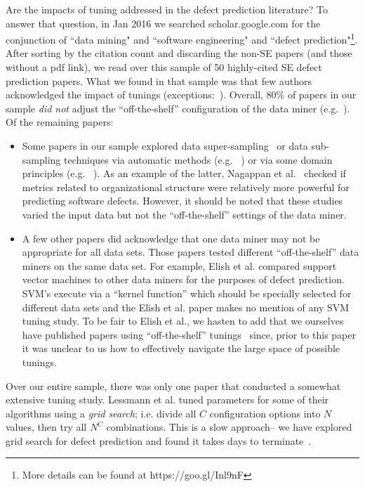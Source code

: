 \documentclass[smallextended]{svjour3}
\newcommand{\bi}{\begin{itemize}[leftmargin=0.4cm]}
\newcommand{\ei}{\end{itemize}}
\begin{document}
Are the impacts of tuning addressed in the defect prediction literature?
To answer that question,  in Jan 2016 we searched scholar.google.com for the conjunction of ``data mining" and ``software engineering" and  ``defect prediction"\footnote{More details can be found at https://goo.gl/Inl9nF}.
After sorting by the citation count and discarding the non-SE papers (and those without a pdf link), we read over this sample
of  50 highly-cited SE defect prediction papers. 
What we found in that sample was that few authors
acknowledged the impact of tunings (exceptions:~\cite{Gao:2011,lessmann2008benchmarking}).
Overall,  80\% of papers in our sample {\em did not} adjust
the ``off-the-shelf'' configuration of the data miner (e.g.~\cite{me07b,Moser:2008,Elish2008649}). Of the remaining papers:
\bi
\item
Some papers in our sample  explored   data super-sampling~\cite{4271036} or data sub-sampling techniques via  automatic methods (e.g. ~\cite{Gao:2011,me07b,4271036,Kim:2011}) 
or via some domain principles (e.g. ~\cite{Moser:2008,Nagappan:2008,Hassan:2009}).
As an example of the latter, Nagappan et al.~\cite{Nagappan:2008} checked if metrics related to organizational structure were relatively more powerful for predicting software defects. 
However, it should be noted that  these studies varied the input data but
not the   ``off-the-shelf''   settings of the data miner.
\item
A few other papers did acknowledge that one data miner may not be appropriate
for all data sets.  Those papers tested  different  
``off-the-shelf'' data miners on the same data set.
For example, Elish et al.\cite{Elish2008649}  compared support vector
machines to other data miners for the purposes of defect prediction. SVM's execute via a ``kernel function'' which should be specially selected for different data sets and
the Elish et al. paper  makes no mention of any SVM tuning study.  
To be fair to Elish et al., we hasten to add that we
ourselves have  published
papers using ``off-the-shelf'' tunings~\cite{me07b} since,
prior to this paper it was unclear to us how to effectively
navigate the large space of possible tunings.
\ei
Over our entire sample, there was only  one paper that conducted a somewhat extensive tuning study.
Lessmann et al.\cite{lessmann2008benchmarking} tuned parameters for some of their algorithms using  a {\em grid search}; i.e. divide all $C$ configuration
options into $N$ values, then try all   $N^C$ combinations.
This is a slow approach-- we have explored grid search for 
defect prediction and found it takes days to terminate~\cite{me07b}.
\end{document}
